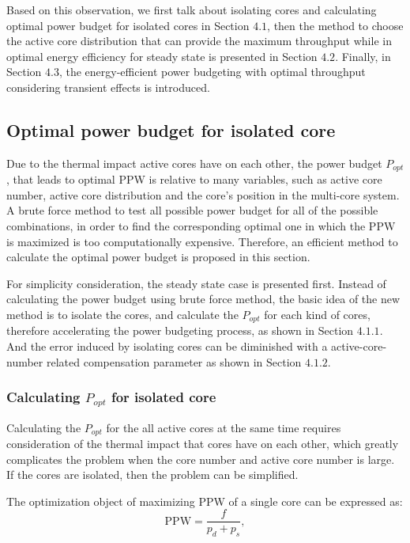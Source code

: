 Based on this observation, we first talk about isolating cores and calculating optimal power budget for isolated cores in Section $4.1$, then the method to choose the active core distribution that can provide the maximum throughput while in optimal energy efficiency for steady state is presented in Section $4.2$. Finally, in Section $4.3$, the energy-efficient power budgeting with optimal throughput considering transient effects is introduced.


\subsection{Optimal power budget for isolated core}
Due to the thermal impact active cores have on each other, the power budget $P_{opt}$, that leads to optimal PPW is relative to many variables, such as active core number, active core distribution and the core's position in the multi-core system. A brute force method to test all possible power budget for all of the possible combinations, in order to find the corresponding optimal one in which the PPW is maximized is too computationally expensive. Therefore, an efficient method to calculate the optimal power budget is proposed in this section.

For simplicity consideration, the steady state case is presented first. Instead of calculating the power budget using brute force method, the basic idea of the new method is to isolate the cores, and calculate the $P_{opt}$ for each kind of cores, therefore accelerating the power budgeting process, as shown in Section $4.1.1$. And the error induced by isolating cores can be diminished with a active-core-number related compensation parameter as shown in Section $4.1.2$.


\subsubsection{Calculating $P_{opt}$ for isolated core}
Calculating the $P_{opt}$ for the all active cores at the same time requires consideration of the thermal impact that cores have on each other, which greatly complicates the problem when the core number and active core number is large. If the cores are isolated, then the problem can be simplified.

The optimization object of maximizing PPW of a single core can be expressed as:
\begin{equation}\label{eq:min_ppw}
\text{PPW}=\frac{f}{p_{d}+p_{s}},
\end{equation}


